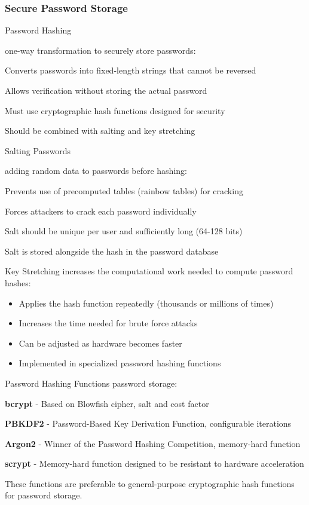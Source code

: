 \subsubsection{Secure Password Storage}

\begin{definition}{Password Hashing}

    one-way transformation to securely store passwords:

    Converts passwords into fixed-length strings that cannot be reversed

    Allows verification without storing the actual password

     Must use cryptographic hash functions designed for security

     Should be combined with salting and key stretching

\end{definition}

\begin{concept}{Salting Passwords}

    adding random data to passwords before hashing:

    Prevents use of precomputed tables (rainbow tables) for cracking

    Forces attackers to crack each password individually

    Salt should be unique per user and sufficiently long (64-128 bits)

    Salt is stored alongside the hash in the password database

\end{concept}

\begin{concept}{Key Stretching}
    increases the computational work needed to compute password hashes:
\begin{itemize}
    \item Applies the hash function repeatedly (thousands or millions of times)
    \item Increases the time needed for brute force attacks
    \item Can be adjusted as hardware becomes faster
    \item Implemented in specialized password hashing functions
\end{itemize}
\end{concept}

\begin{theorem}{Password Hashing Functions}
     password storage:

     \textbf{bcrypt} - Based on Blowfish cipher, salt and cost factor

     \textbf{PBKDF2} - Password-Based Key Derivation Function, configurable iterations

     \textbf{Argon2} - Winner of the Password Hashing Competition, memory-hard function

     \textbf{scrypt} - Memory-hard function designed to be resistant to hardware acceleration

These functions are preferable to general-purpose cryptographic hash functions for password storage.
\end{theorem}


